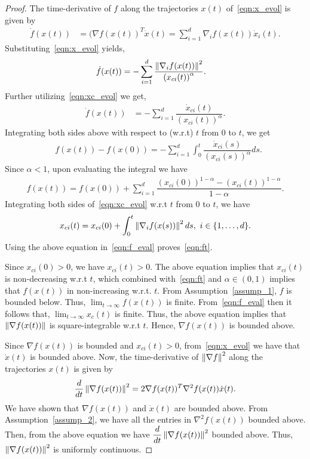 \begin{proof}
The time-derivative of $f$ along the trajectories $x(t)$  of~\eqref{eqn:x_evol} is given by
\begin{align*}
    \Dot{f}(x(t)) & = (\nabla f(x(t))^T \Dot{x}(t) = \sum_{i=1}^d \nabla_i f(x(t)) \Dot{x}_{i}(t).
\end{align*}
Substituting~\eqref{eqn:x_evol} yields,
\begin{align*}
    \Dot{f}(x(t)) & =  - \sum_{i=1}^d \dfrac{\left\lVert\nabla_i f(x(t))\right\rVert ^2}{\left(x_{ci}(t)\right)^\alpha}.
\end{align*}
Further utilizing~\eqref{eqn:xc_evol} we get,
\begin{align}
    \Dot{f}(x(t)) & =  - \sum_{i=1}^d \dfrac{\Dot{x}_{ci}(t)}{\left(x_{ci}(t)\right)^\alpha}. \label{eqn:fdot}
\end{align}
Integrating both sides above with respect to (w.r.t) $t$ from $0$ to $t$, we get
\begin{align}
   & f(x(t))-f(x(0)) = - \sum_{i=1}^d \int_0^t \dfrac{\Dot{x}_{ci}(s)}{\left(x_{ci}(s)\right)^\alpha} ds. \label{eqn:f_int}
\end{align}
Since $\alpha < 1$, upon evaluating the integral we have
\begin{align}
    f(x(t)) = f(x(0)) + \sum_{i=1}^d \dfrac{\left(x_{ci}(0)\right)^{1-\alpha} - \left(x_{ci}(t)\right)^{1-\alpha}}{1-\alpha}. \label{eqn:f_eval}
\end{align}
Integrating both sides of~\eqref{eqn:xc_evol} w.r.t $t$ from $0$ to $t$, we have
\begin{align*}
    x_{ci}(t) = x_{ci}(0) + \int_0^t \left\lVert\nabla_i f(x(s))\right\rVert ^2 ds, ~ i \in \{1,\ldots,d\}.
\end{align*}
Using the above equation in~\eqref{eqn:f_eval} proves~\eqref{eqn:ft}.

Since $x_{ci}(0) > 0$, we have $x_{ci}(t) > 0$.
The above equation implies that $x_{ci}(t)$ is non-decreasing w.r.t $t$, which combined with~\eqref{eqn:ft} and $\alpha\in (0,1)$ implies that $f(x(t))$ in non-increasing w.r.t. $t$. From Assumption~\ref{assump_1}, $f$ is bounded below. Thus, $\lim_{t \to \infty} f(x(t))$ is finite. From~\eqref{eqn:f_eval} then it follows that, $\lim_{t \to \infty} x_{c}(t)$ is finite. Thus, the above equation implies that $\left\lVert\nabla f(x(t))\right\rVert $ is square-integrable w.r.t $t$. Hence, $\nabla f(x(t))$ is bounded above. 

Since $\nabla f(x(t))$ is bounded and $x_{ci}(t) > 0$,  from~\eqref{eqn:x_evol} we have that $\Dot{x}(t)$ is bounded above. Now, the time-derivative of $\left\lVert\nabla f\right\rVert ^2$ along the trajectories $x(t)$ is given by
\begin{align*}
    \dfrac{d}{dt} \left\lVert\nabla f(x(t))\right\rVert ^2 = 2\nabla f(x(t))^T \nabla^2 f(x(t)) \Dot{x}(t).
\end{align*}
We have shown that $\nabla f(x(t))$ and $\Dot{x}(t)$ are bounded above. From Assumption~\ref{assump_2}, we have all the entries in $\nabla^2 f(x(t))$ bounded above. Then, from the above equation we have $\dfrac{d}{dt} \left\lVert\nabla f(x(t))\right\rVert ^2$ bounded above. Thus, $\left\lVert\nabla f(x(t))\right\rVert ^2$ is uniformly continuous.


\end{proof}
